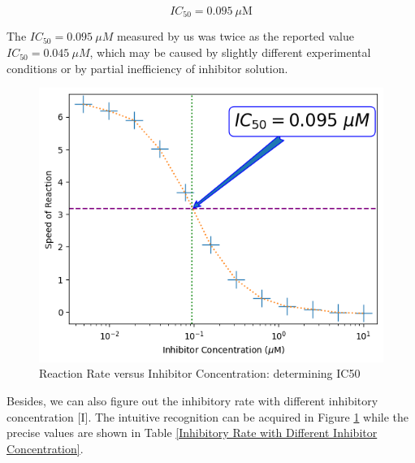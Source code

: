 \documentclass{report}
\begin{document}
$$
IC_{50}=0.095\ \mu \text{M}
$$

The $IC_{50}=0.095\ \mu M$ measured by us was twice as the reported value $IC_{50}=0.045\ \mu M$, which may be caused by slightly different experimental conditions or by partial inefficiency of inhibitor solution.
\begin{figure}
    \centering
    \includegraphics[width=1\linewidth]{../Figures/inhibitor2.png}
    \caption{Reaction Rate versus Inhibitor Concentration: determining IC50}
    \label{Reaction Rate versus Inhibitor Concentration: determining IC50}
\end{figure}

Besides, we can also figure out the inhibitory rate with different inhibitory concentration [I].
The intuitive recognition can be acquired in Figure \ref{Reaction Rate versus Inhibitor Concentration: determining IC50} while the precise values are shown in Table \ref{Inhibitory Rate with Different Inhibitor Concentration}.
\end{document}
